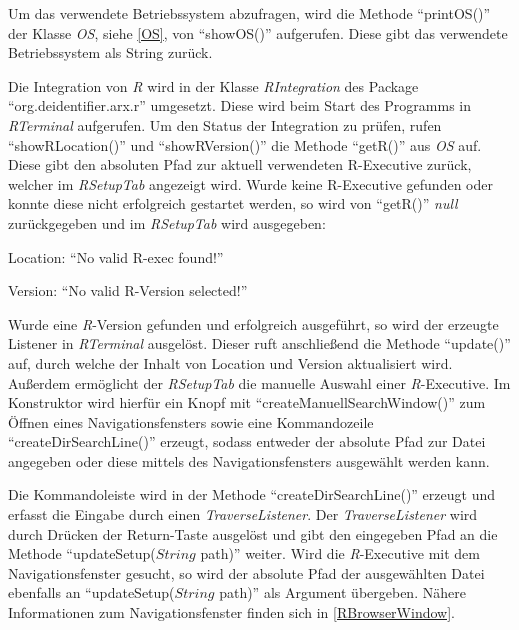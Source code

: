 \documentclass[a4paper, 12pt]{report} %
\begin{document}
Um das verwendete Betriebssystem abzufragen, wird die Methode "`printOS()"' der Klasse \textit{OS}, siehe \ref{OS}, von "`showOS()"' aufgerufen. Diese gibt das verwendete Betriebssystem als String zurück.


Die Integration von \textit{R} wird in der Klasse \textit{RIntegration} des  Package "`org.deidentifier.arx.r"' umgesetzt. Diese wird beim Start des Programms in \textit{RTerminal} aufgerufen. 
 Um den Status der Integration zu prüfen, rufen "`showRLocation()"' und "`showRVersion()"' die Methode "`getR()"' aus \textit{OS} auf. Diese gibt den absoluten Pfad zur aktuell verwendeten R-Executive zurück, welcher im \textit{RSetupTab} angezeigt wird.
Wurde keine R-Executive gefunden oder konnte diese nicht erfolgreich gestartet werden, so wird von "`getR()"' \textit{null} zurückgegeben und im \textit{RSetupTab} wird ausgegeben:  
\begin{center}
Location: "`No valid R-exec found!"'

Version: "`No valid R-Version selected!"'
\end{center}
Wurde eine \textit{R}-Version gefunden und erfolgreich ausgeführt, so wird der erzeugte Listener in \textit{RTerminal} ausgelöst. Dieser ruft anschließend die Methode "`update()"' auf, durch welche der Inhalt von Location und Version aktualisiert wird.\\

Außerdem ermöglicht der \textit{RSetupTab} die manuelle Auswahl einer \textit{R}-Executive. Im Konstruktor wird hierfür ein Knopf mit "`createManuellSearchWindow()"' zum Öffnen eines Navigationsfensters sowie eine Kommandozeile "`createDirSearchLine()"' erzeugt, sodass entweder der absolute Pfad zur Datei angegeben oder diese mittels des Navigationsfensters ausgewählt werden kann.

Die Kommandoleiste wird in der Methode "`createDirSearchLine()"' erzeugt und erfasst die Eingabe durch einen \textit{TraverseListener}. Der \textit{TraverseListener} wird durch Drücken der Return-Taste ausgelöst und gibt den eingegeben Pfad an die Methode "`updateSetup($String$ path)"' weiter. Wird die \textit{R}-Executive mit dem Navigationsfenster gesucht, so wird der absolute Pfad der ausgewählten Datei ebenfalls an "`updateSetup($String$ path)"' als Argument übergeben. Nähere Informationen zum Navigationsfenster finden sich in \ref{RBrowserWindow}.
\end{document}
